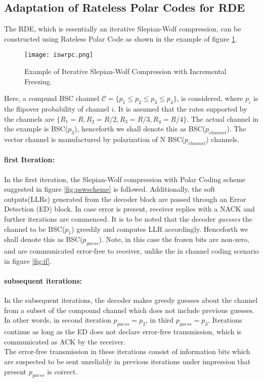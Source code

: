 \documentclass[
11pt, %
a4paper, %
oneside, %
headinclude,footinclude, %
BCOR5mm, %
]{scrartcl}
\begin{document}
\subsection{Adaptation of Rateless Polar Codes for RDE}\label{adapt}
The RDE, which is essentially an iterative Slepian-Wolf compression, can be constructed using Rateless Polar Code as shown in the example of figure \ref{fig:iswrpc}.
\begin{figure}[h]
 \begin{center}
    \texttt{[image: iswrpc.png]}
  \end{center}
  \caption{Example of Iterative Slepian-Wolf Compression with Incremental Freezing.}
  \label{fig:iswrpc}
\end{figure} 
Here, a compund BSC channel $\mathcal{C}=\{ p_1 \leq p_2 \leq p_3 \leq p_4\}$, is considered, where $p_i$ is the flipover probability of channel $i$. It is assumed that the rates supported by the channels are $\{ R_1=R, R_2= R/2,R_3= R/3,R_4= R/4\}$. The actual channel in the example is BSC($p_3$), henceforth we shall denote this as BSC($p_{channel}$). The vector channel is manufactured by polarization of N BSC($p_{channel}$) channels.
\paragraph{first Iteration:} In the first iteration, the Slepian-Wolf compression with Polar Coding scheme suggested in figure \ref{fig:pswscheme} is followed. Additionally, the soft outputs(LLRs) generated from the decoder block are passed through an Error Detection (ED) block. In case error is present, receiver replies with a NACK and further iterations are commenced. It is to be noted that the decoder \emph{guesses} the channel to be BSC($p_1$) greedily and computes LLR accordingly. Henceforth we shall denote this as BSC($p_{guess}$). Note, in this case the frozen bits are non-zero, and are communicated error-free to receiver, unlike the in channel coding scenario in figure \ref{fig:if}.
\paragraph{subsequent iterations:}In the subsequent iterations, the decoder makes greedy guesses about the channel from a subset of the compound channel which does not include previous guesses. In other words, in second iteration $p_{guess}=p_2$, in third $p_{guess}=p_3$. Iterations continue as long as the ED does not declare error-free transmission, which is communicated as ACK by the receiver.\\
The error-free transmission in these iterations consist of information bits which are suspected to be sent unreliably in previous iterations under impression that present $p_{guess}$ is correct. 
\end{document}
